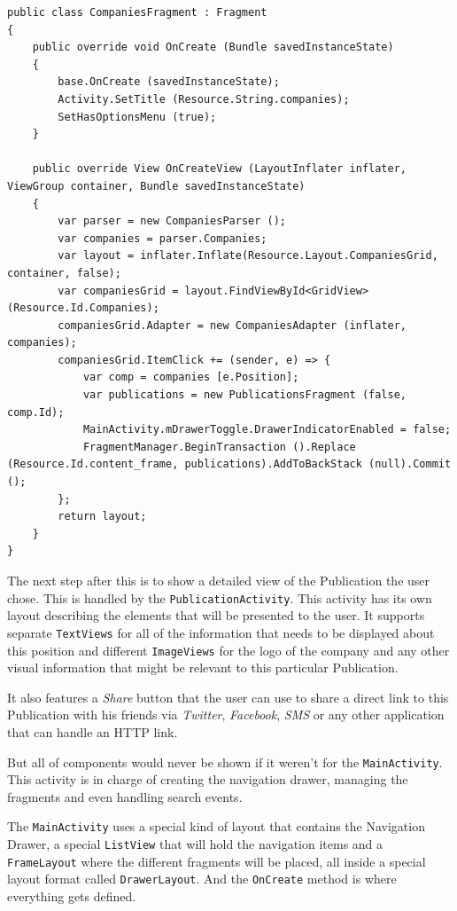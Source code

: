 \begin{lstlisting}[frame=lt,caption=CompaniesFragment.cs, label={list:comp_frag}]
public class CompaniesFragment : Fragment
{
	public override void OnCreate (Bundle savedInstanceState)
	{
		base.OnCreate (savedInstanceState);
		Activity.SetTitle (Resource.String.companies);
		SetHasOptionsMenu (true);
	}

	public override View OnCreateView (LayoutInflater inflater, ViewGroup container, Bundle savedInstanceState)
	{
		var parser = new CompaniesParser ();
		var companies = parser.Companies;
		var layout = inflater.Inflate(Resource.Layout.CompaniesGrid, container, false);
		var companiesGrid = layout.FindViewById<GridView> (Resource.Id.Companies);
		companiesGrid.Adapter = new CompaniesAdapter (inflater, companies);
		companiesGrid.ItemClick += (sender, e) => {
			var comp = companies [e.Position];
			var publications = new PublicationsFragment (false, comp.Id);
			MainActivity.mDrawerToggle.DrawerIndicatorEnabled = false;
			FragmentManager.BeginTransaction ().Replace (Resource.Id.content_frame, publications).AddToBackStack (null).Commit ();
		};
		return layout;
	}
}
\end{lstlisting}



The next step after this is to show a detailed view of the Publication the user chose. This is handled by the \texttt{PublicationActivity}. This activity has its own layout describing the elements that will be presented to the user. It supports separate \texttt{TextViews} for all of the information that needs to be displayed about this position and different \texttt{ImageViews} for the logo of the company and any other visual information that might be relevant to this particular Publication.

It also features a \textit{Share} button that the user can use to share a direct link to this Publication with his friends via \textit{Twitter}, \textit{Facebook}, \textit{SMS} or any other application that can handle an HTTP link.\newline

But all of components would never be shown if it weren't for the \texttt{MainActivity}. This activity is in charge of creating the navigation drawer, managing the fragments and even handling search events.

The \texttt{MainActivity} uses a special kind of layout that contains the Navigation Drawer, a special \texttt{ListView} that will hold the navigation items and a \texttt{FrameLayout} where the different fragments will be placed, all inside a special layout format called \texttt{DrawerLayout}. And the \texttt{OnCreate} method is where everything gets defined.
\newpage

